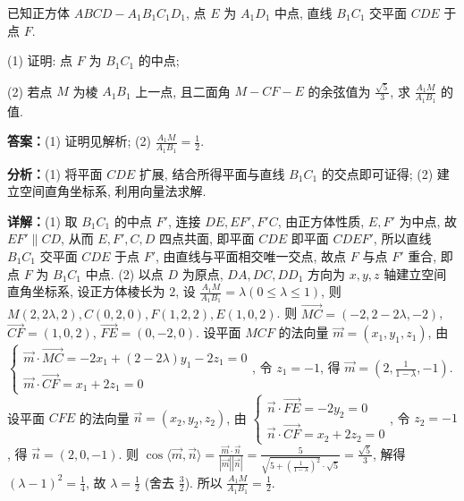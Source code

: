 \begin{question}[points=14]
已知正方体 $ABCD-A_1B_1C_1D_1$, 点 $E$ 为 $A_1D_1$ 中点, 直线 $B_1C_1$ 交平面 $CDE$ 于点 $F$.

(1) 证明: 点 $F$ 为 $B_1C_1$ 的中点;

(2) 若点 $M$ 为棱 $A_1B_1$ 上一点, 且二面角 $M-CF-E$ 的余弦值为 $\frac{\sqrt{5}}{3}$, 求 $\frac{A_1M}{A_1B_1}$ 的值.
\begin{solution}
\textbf{答案：}(1) 证明见解析; (2) $\frac{A_1M}{A_1B_1}=\frac{1}{2}$.

\textbf{分析：}(1) 将平面 $CDE$ 扩展, 结合所得平面与直线 $B_1C_1$ 的交点即可证得; (2) 建立空间直角坐标系, 利用向量法求解.

\textbf{详解：}(1) 取 $B_1C_1$ 的中点 $F'$, 连接 $DE, EF', F'C$, 由正方体性质, $E,F'$ 为中点, 故 $EF'\parallel CD$, 从而 $E,F',C,D$ 四点共面, 即平面 $CDE$ 即平面 $CDEF'$, 所以直线 $B_1C_1$ 交平面 $CDE$ 于点 $F'$, 由直线与平面相交唯一交点, 故点 $F$ 与点 $F'$ 重合, 即点 $F$ 为 $B_1C_1$ 中点.
(2) 以点 $D$ 为原点, $DA, DC, DD_1$ 方向为 $x,y,z$ 轴建立空间直角坐标系, 设正方体棱长为 $2$, 设 $\frac{A_1M}{A_1B_1}=\lambda(0\leq\lambda\leq1)$, 则 $M(2,2\lambda,2), C(0,2,0), F(1,2,2), E(1,0,2)$. 则 $\overrightarrow{MC}=(-2,2-2\lambda,-2)$, $\overrightarrow{CF}=(1,0,2)$, $\overrightarrow{FE}=(0,-2,0)$. 设平面 $MCF$ 的法向量 $\vec{m}=(x_1,y_1,z_1)$, 由 $\begin{cases} \vec{m}\cdot\overrightarrow{MC}=-2x_1+(2-2\lambda)y_1-2z_1=0 \\ \vec{m}\cdot\overrightarrow{CF}=x_1+2z_1=0 \end{cases}$, 令 $z_1=-1$, 得 $\vec{m}=(2,\frac{1}{1-\lambda},-1)$. 设平面 $CFE$ 的法向量 $\vec{n}=(x_2,y_2,z_2)$, 由 $\begin{cases} \vec{n}\cdot\overrightarrow{FE}=-2y_2=0 \\ \vec{n}\cdot\overrightarrow{CF}=x_2+2z_2=0 \end{cases}$, 令 $z_2=-1$, 得 $\vec{n}=(2,0,-1)$. 则 $\cos\langle\vec{m},\vec{n}\rangle=\frac{\vec{m}\cdot\vec{n}}{|\vec{m}||\vec{n}|}=\frac{5}{\sqrt{5+(\frac{1}{1-\lambda})^2}\cdot\sqrt{5}}=\frac{\sqrt{5}}{3}$, 解得 $(\lambda-1)^2=\frac{1}{4}$, 故 $\lambda=\frac{1}{2}$ (舍去 $\frac{3}{2}$). 所以 $\frac{A_1M}{A_1B_1}=\frac{1}{2}$.
\end{solution}
\end{question}


